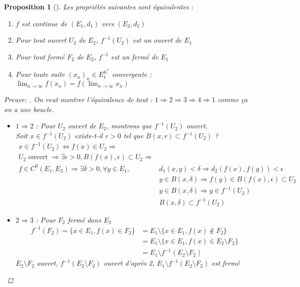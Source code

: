 \documentclass{article}
\theoremstyle{plain}%
\newtheorem{prop}[thm]{Proposition}
\theoremstyle{definition}
\theoremstyle{remark}
\begin{document}
\begin{prop}[]
    Les propriétés suivantes sont équivalentes : \begin{enumerate}
        \item $ f $ est continue de $ (E_1,d_1) $ vers $ (E_2, d_2) $ 
        \item Pour tout ouvert $ U_2 $ de $ E_2 $, $ f^{-1}(U_2) $ est un ouvert de $ E_1 $ 
        \item Pour tout fermé $ F_2 $ de $ E_2 $, $ f^{-1} $ est un fermé de $ E_1 $ 
        \item Pour toute suite $ (x_n)_n \in E_1^{\mathbb{N}^*} $ convergente : $ \lim_{n \to \infty} f(x_n) = f(\lim_{n \to \infty} x_n) $ 
    \end{enumerate}

    \begin{proof}[Preuve: ]
        On veut montrer l'équivalence de tout : $ 1 \Rightarrow 2 \Rightarrow 3 \Rightarrow 4 \Rightarrow 1  $ comme ça on a une boucle. 
        \begin{itemize}
            \item $ 1 \Rightarrow 2 $ : Pour $ U_2 $ ouvert de $ E_2 $, montrons que $ f^{-1} (U_2) $ ouvert. \\
            Soit $ x \in f^{-1}(U_2) $ existe-t-il $ r>0 $ tel que $ B(x,r) \subset f^{-1}(U_2) $ ?
            \begin{align*}
                x \in f^{-1}(U_2) \Leftrightarrow f(x) \in U_2 \Rightarrow\\
                U_2 \text{ ouvert } \Rightarrow \exists \epsilon > 0, B(f(x), \epsilon ) \subset U_2 \Rightarrow\\
                f \in C^0(E_1, E_2) \Rightarrow \exists \delta > 0, \forall y \in E_1, & d_1(x,y) < \delta \Rightarrow d_2(f(x), f(y)) < \epsilon \\
                        & y \in B(x, \delta ) \Rightarrow f(y) \in B(f(x), \epsilon ) \subset U_2 \\
                        & y \in B(x, \delta ) \Rightarrow y \in f^{-1}(U_2) \\
                        & B(x, \delta ) \subset f^{-1}(U_2)
            \end{align*}

            \item $ 2 \Rightarrow 3 $ : Pour $ F_2 $ fermé dans $ E_2 $
            \begin{align*}
                f^{-1}(F_2) = \{x \in E_1, f(x) \in F_2\} &= E_1 \setminus \{x \in E_1, f(x) \not\in F_2 \} \\
                &= E_1 \setminus \{x \in E_1, f(x) \in E_2 \setminus F_2 \} \\
                &= E_1 \setminus f^{-1}(E_2 \setminus F_2)
            \end{align*}
            $ E_2 \setminus F_2 $ ouvert, $ f^{-1}(E_2 \setminus F_2) $ ouvert d'après 2, $ E_1 \setminus f^{-1}(E_2 \setminus F_2) $ est fermé


\end{itemize}
\end{proof}
\end{prop}
\end{document}
